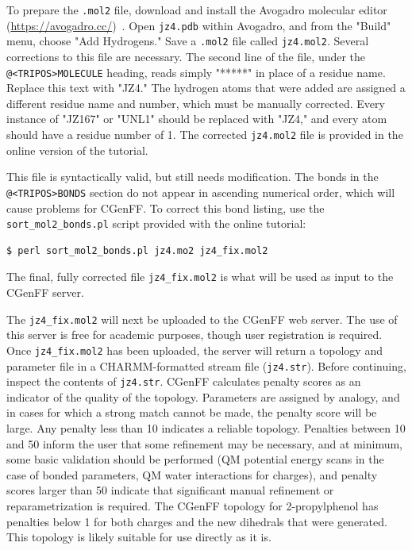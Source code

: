 \documentclass[9pt,tutorial,pubversion]{livecoms}
\begin{document}
To prepare the \texttt{.mol2} file, download and install the Avogadro molecular editor (\url{https://avogadro.cc/})~\cite{Hanwell2012}. Open \texttt{jz4.pdb} within Avogadro, and from the "Build" menu, choose "Add Hydrogens." Save a \texttt{.mol2} file called \texttt{jz4.mol2}. Several corrections to this file are necessary. The second line of the file, under the \texttt{@<TRIPOS>MOLECULE} heading, reads simply "*****" in place of a residue name. Replace this text with "JZ4." The hydrogen atoms that were added are assigned a different residue name and number, which must be manually corrected. Every instance of "JZ167" or "UNL1" should be replaced with "JZ4," and every atom should have a residue number of 1. The corrected \texttt{jz4.mol2} file is provided in the online version of the tutorial.

This file is syntactically valid, but still needs modification. The bonds in the \texttt{@<TRIPOS>BONDS} section do not appear in ascending numerical order, which will cause problems for CGenFF. To correct this bond listing, use the \texttt{sort\_mol2\_bonds.pl} script provided with the online tutorial:

\begin{lstlisting}
$ perl sort_mol2_bonds.pl jz4.mo2 jz4_fix.mol2
\end{lstlisting}
%
The final, fully corrected file \texttt{jz4\_fix.mol2} is what will be used as input to the CGenFF server.

The \texttt{jz4\_fix.mol2} will next be uploaded to the CGenFF web server. The use of this server is free for academic purposes, though user registration is required. Once \texttt{jz4\_fix.mol2} has been uploaded, the server will return a topology and parameter file in a CHARMM-formatted stream file (\texttt{jz4.str}). Before continuing, inspect the contents of \texttt{jz4.str}. CGenFF calculates penalty scores as an indicator of the quality of the topology. Parameters are assigned by analogy, and in cases for which a strong match cannot be made, the penalty score will be large. Any penalty less than 10 indicates a reliable topology. Penalties between 10 and 50 inform the user that some refinement may be necessary, and at minimum, some basic validation should be performed (QM potential energy scans in the case of bonded parameters, QM water interactions for charges), and penalty scores larger than 50 indicate that significant manual refinement or reparametrization is required. The CGenFF topology for 2-propylphenol has penalties below 1 for both charges and the new dihedrals that were generated. This topology is likely suitable for use directly as it is.
\end{document}
